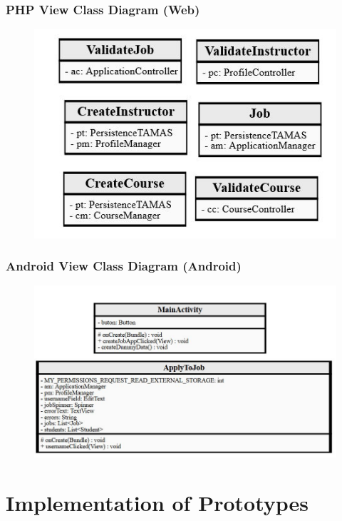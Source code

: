 \documentclass[12pt]{report}
\begin{document}
\section{PHP View Class Diagram (Web)}
\begin{figure}[H]
	\centering
	\includegraphics[]{./Design/ClassDiagrams/WebViewPackageDiagram}
\end{figure}
\section{Android View Class Diagram (Android)}
\begin{figure}[H]
	\centering
	\includegraphics[]{./Design/ClassDiagrams/AndroidViewPackageDiagram}
\end{figure}

\part{Implementation of Prototypes}
\end{document}
